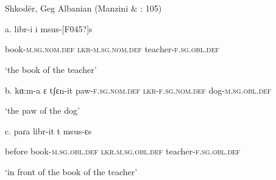 \documentclass[output=paper]{langsci/langscibook}
\begin{document}
\begin{styleSfondomedioiColorexxi}
\ea%
    \label{ex:key:2}
    \gll\\
        \\
    \glt
    \z

          Shkodër, Geg Albanian  (Manzini \& \citealt{Savoia2011b}: 105)
\end{styleSfondomedioiColorexxi}

\begin{styleSfondomedioiColorexxi}
a.  libr-i          i       msus-[F045?]s   
\end{styleSfondomedioiColorexxi}

\begin{styleparagrafo}
    book-\textsc{m.sg.nom.def}  \textsc{lkr-m.sg.nom.def}   teacher-\textsc{f.sg.obl.def} 
\end{styleparagrafo}

\begin{styleparagrafo}
  ‘the book of the teacher’ 
\end{styleparagrafo}

\begin{styleparagrafo}
b.  kɑ:m-a      ɛ          tʃɛn-it                paw-\textsc{f.sg.nom.def}   \textsc{lkr-f.sg.nom.def}  dog-\textsc{m.sg.obl.def}  
\end{styleparagrafo}

\begin{styleparagrafo}
‘the paw of the dog’ 
\end{styleparagrafo}

\begin{styleSfondomedioiColorexxi}
  c.  paɾa     libr-it       t       msus-ɛs
\end{styleSfondomedioiColorexxi}

\begin{styleSfondomedioiColorexxi}
    before   book-\textsc{m.sg.obl.def}  \textsc{lkr.m.sg.obl.def}  teacher-\textsc{f.sg.obl.def}
\end{styleSfondomedioiColorexxi}

\begin{styleSfondomedioiColorexxi}
    ‘in front of the book of the teacher’   
\end{styleSfondomedioiColorexxi}
\end{document}
